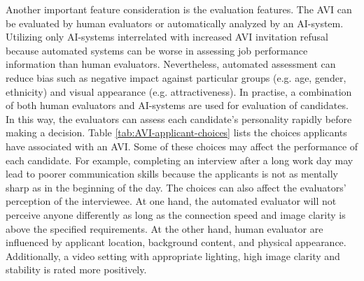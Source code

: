Another important feature consideration is the evaluation features. The AVI can be evaluated by human evaluators or automatically analyzed by an AI-system. Utilizing only AI-systems interrelated with increased AVI invitation refusal because automated systems can be worse in assessing job performance information than human evaluators. Nevertheless, automated assessment can reduce bias such as negative impact against particular groups (e.g. age, gender, ethnicity) and visual appearance (e.g. attractiveness). In practise, a combination of both human evaluators and AI-systems are used for evaluation of candidates. In this way, the evaluators can assess each candidate's personality rapidly before making a decision. Table \ref{tab:AVI-applicant-choices} lists the choices applicants have associated with an AVI. Some of these choices may affect the performance of each candidate. For example, completing an interview after a long work day may lead to poorer communication skills because the applicants is not as mentally sharp as in the beginning of the day. The choices can also affect the evaluators' perception of the interviewee. At one hand, the automated evaluator will not perceive anyone differently as long as the connection speed and image clarity is above the specified requirements. At the other hand, human evaluator are influenced by applicant location, background content, and physical appearance. Additionally, a video setting with appropriate lighting, high image clarity and stability is rated more positively. 
%
